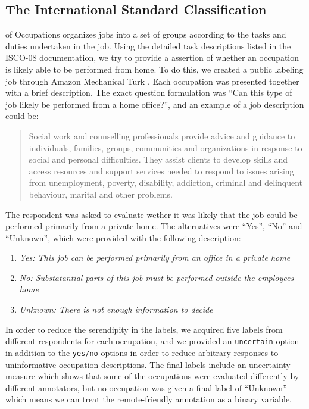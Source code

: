 \documentclass[11pt,]{article}
\begin{document}
\hypertarget{the-international-standard-classification}{%
\subsection{The International Standard
Classification}\label{the-international-standard-classification}}

of Occupations organizes jobs into a set of groups according to the
tasks and duties undertaken in the job. Using the detailed task
descriptions listed in the ISCO-08 documentation, we try to provide a
assertion of whether an occupation is likely able to be performed from
home. To do this, we created a public labeling job through Amazon
Mechanical Turk \citep{Turk2020}. Each occupation was presented together
with a brief description. The exact question formulation was ``Can this
type of job likely be performed from a home office?'', and an example of
a job description could be:

\begin{quote}
Social work and counselling professionals provide advice and guidance to
individuals, families, groups, communities and organizations in response
to social and personal difficulties. They assist clients to develop
skills and access resources and support services needed to respond to
issues arising from unemployment, poverty, disability, addiction,
criminal and delinquent behaviour, marital and other problems.
\end{quote}

The respondent was asked to evaluate wether it was likely that the job
could be performed primarily from a private home. The alternatives were
``Yes'', ``No'' and ``Unknown'', which were provided with the following
description:

\begin{enumerate}
\def\labelenumi{\arabic{enumi}.}
\item
  \emph{Yes: This job can be performed primarily from an office in a
  private home}
\item
  \emph{No: Substatantial parts of this job must be performed outside
  the employees home}
\item
  \emph{Unknown: There is not enough information to decide}
\end{enumerate}

In order to reduce the serendipity in the labels, we acquired five
labels from different respondents for each occupation, and we provided
an \texttt{uncertain} option in addition to the \texttt{yes/no} options
in order to reduce arbitrary responses to uninformative occupation
descriptions. The final labels include an uncertainty measure which
shows that some of the occupations were evaluated differently by
different annotators, but no occupation was given a final label of
``Unknown'' which means we can treat the remote-friendly annotation as a
binary variable.
\end{document}
